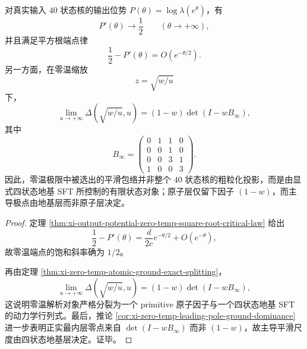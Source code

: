 \begin{theorem}[零温平滑包络的有限状态化]\label{thm:xi-time-part67-zero-temp-envelope-finite-stateization}
对真实输入 \(40\) 状态核的输出位势 \(P(\theta)=\log\lambda(e^\theta)\)，有
\[
P'(\theta)\longrightarrow \frac12
\qquad (\theta\to+\infty),
\]
并且满足平方根端点律
\[
\frac12-P'(\theta)=O(e^{-\theta/2}).
\]
另一方面，在零温缩放
\[
z=\sqrt{w/u}
\]
下，
\[
\lim_{u\to+\infty}\Delta\!\left(\sqrt{w/u},u\right)
=
(1-w)\det(I-wB_\infty),
\]
其中
\[
B_\infty=
\begin{pmatrix}
0&1&1&0\\
0&0&1&0\\
0&0&3&1\\
1&0&0&3
\end{pmatrix}.
\]
因此，零温极限中被选出的平滑包络并非整个 \(40\) 状态核的粗粒化投影，而是由显式四状态地基 SFT 所控制的有限状态对象；原子层仅留下因子 \((1-w)\)，而主导极点由地基层而非原子层决定。
\end{theorem}
\begin{proof}
定理 \ref{thm:xi-output-potential-zero-temp-square-root-critical-law} 给出
\[
\frac12-P'(\theta)=\frac{d}{2c}e^{-\theta/2}+O(e^{-\theta}),
\]
故零温端点的饱和斜率确为 \(1/2\)。

再由定理 \ref{thm:xi-zero-temp-atomic-ground-exact-splitting}，
\[
\lim_{u\to+\infty}\Delta\!\left(\sqrt{w/u},u\right)
=(1-w)\det(I-wB_\infty),
\]
这说明零温解析对象严格分裂为一个 primitive 原子因子与一个四状态地基 SFT 的动力学行列式。最后，推论 \ref{cor:xi-zero-temp-leading-pole-ground-dominance} 进一步表明正实最内层零点来自 \(\det(I-wB_\infty)\) 而非 \((1-w)\)，故主导平滑尺度由四状态地基层决定。证毕。
\end{proof}

